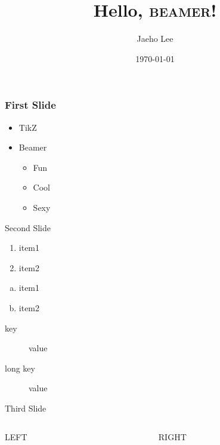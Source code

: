 \documentclass{beamer}
\title{Hello, \textsc{beamer}!}
\author{Jaeho Lee}
\date{\today}
\begin{document}
\maketitle
\begin{frame}
  \frametitle{First Slide}
  \begin{itemize}
    \item TikZ
    \item Beamer
      \begin{itemize}
        \item Fun
        \item Cool
        \item Sexy
      \end{itemize}
  \end{itemize}
\end{frame}
\begin{frame}{Second Slide}
  \begin{enumerate}
    \item item1
    \item item2
  \end{enumerate}
  \begin{enumerate}[(a)]
    \item item1
    \item item2
  \end{enumerate}
  \begin{description}
    \item[key] value
    \item[long key] value
  \end{description}
\end{frame}
\begin{frame}{Third Slide}
  \begin{columns}
    \begin{column}{0.5\textwidth}
      \LARGE LEFT
    \end{column}
    \begin{column}{0.5\textwidth}
      \LARGE RIGHT
    \end{column}
  \end{columns}
\end{frame}
\end{document}
